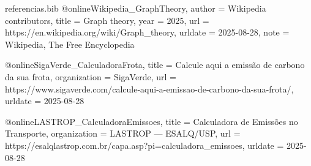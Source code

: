 \begin{filecontents*}{referencias.bib}
@online{Wikipedia_GraphTheory,
	author   = {{Wikipedia contributors}},
	title    = {Graph theory},
	year     = {2025},
	url      = {https://en.wikipedia.org/wiki/Graph_theory},
	urldate  = {2025-08-28},
	note     = {Wikipedia, The Free Encyclopedia}
}

@online{SigaVerde_CalculadoraFrota,
	title        = {Calcule aqui a emissão de carbono da sua frota},
	organization = {SigaVerde},
	url          = {https://www.sigaverde.com/calcule-aqui-a-emissao-de-carbono-da-sua-frota/},
	urldate      = {2025-08-28}
}

@online{LASTROP_CalculadoraEmissoes,
	title        = {Calculadora de Emissões no Transporte},
	organization = {LASTROP — ESALQ/USP},
	url          = {https://esalqlastrop.com.br/capa.asp?pi=calculadora_emissoes},
	urldate      = {2025-08-28}
}

\end{filecontents*}

\documentclass[
12pt,
a4paper,
semrecuonosumario,
sumario = abnt-6027-2012]{report}

\usepackage[T1]{fontenc}
\usepackage[utf8]{inputenc}
\usepackage[brazil]{babel}
\usepackage{amsmath}
\usepackage{geometry}
\geometry{a4paper,margin=2.5cm}
\usepackage{setspace}
\onehalfspacing
\usepackage{graphicx}
\usepackage{float}
\usepackage[hidelinks]{hyperref}
\usepackage{titlesec}
\usepackage{tocloft}
\usepackage{helvet}
\renewcommand{\familydefault}{\sfdefault}
\usepackage{ragged2e}
\usepackage{indentfirst}
\usepackage{subcaption}
\usepackage{amsmath}
\setcounter{MaxMatrixCols}{22}
\usepackage[style=authoryear,backend=biber]{biblatex}
\usepackage{textcomp}



\usepackage{listings}

\usepackage{algorithm}
\usepackage{algpseudocode}


